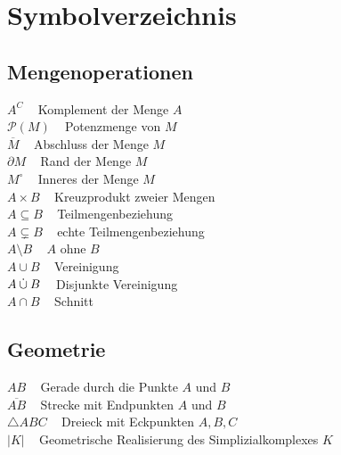 \twocolumn
\chapter*{Symbolverzeichnis}
\section*{Mengenoperationen}
$A^C\;\;\;$ Komplement der Menge $A$\\
$\mathcal{P}(M)\;\;\;$ Potenzmenge von $M$\\
$\overline{M}\;\;\;$ Abschluss der Menge $M$\\
$\partial M\;\;\;$ Rand der Menge $M$\\
$M^\circ\;\;\;$ Inneres der Menge $M$\\
$A \times B\;\;\;$ Kreuzprodukt zweier Mengen\\
$A \subseteq B\;\;\;$ Teilmengenbeziehung\\
$A \subsetneq B\;\;\;$ echte Teilmengenbeziehung\\
$A \setminus B\;\;\;$ $A$ ohne $B$\\
$A \cup B\;\;\;$ Vereinigung\\
$A \mathbin{\dot{\cup}} B\;\;\;$ Disjunkte Vereinigung\\
$A \cap B\;\;\;$ Schnitt\\

\section*{Geometrie}
$AB\;\;\;$ Gerade durch die Punkte $A$ und $B$\\
$\overline{AB}\;\;\;$ Strecke mit Endpunkten $A$ und $B$\\
$\triangle ABC\;\;\;$ Dreieck mit Eckpunkten $A, B, C$\\
$|K|\;\;\;$ Geometrische Realisierung des Simplizialkomplexes $K$\\
